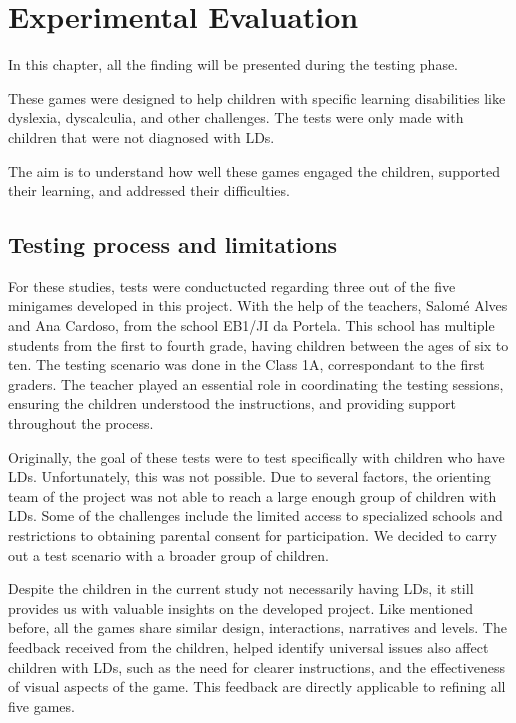 \chapter{Experimental Evaluation}
\label{cha:results}

In this chapter, all the finding will be presented during the testing phase.

These games were designed to help children with specific learning disabilities like dyslexia, dyscalculia, and other challenges. The tests were only made with children that were not diagnosed with LDs.

The aim is to understand how well these games engaged the children, supported their learning, and addressed their difficulties.


\newpage

\section{Testing process and limitations}

For these studies, tests were conductucted regarding three out of the five minigames developed in this project.
With the help of the teachers, Salomé Alves and Ana Cardoso, from the school EB1/JI da Portela. This school has multiple students from the first to fourth grade, having children between the ages of six to ten.
The testing scenario was done in the Class 1A, correspondant to the first graders.
The teacher played an essential role in coordinating the testing sessions, ensuring the children understood the instructions, and providing support throughout the process.

Originally, the goal of these tests were to test specifically with children who have LDs. Unfortunately, this was not possible. Due to several factors, the orienting team of the project was not able to reach a large enough group of children with LDs. Some of the challenges include the limited access to specialized schools and restrictions to obtaining parental consent for participation. We decided to carry out a test scenario with a broader group of children.

Despite the children in the current study not necessarily having LDs, it still provides us with valuable insights on the developed project. Like mentioned before, all the games share similar design, interactions, narratives and levels. The feedback received from the children, helped identify universal issues also affect children with LDs, such as the need for clearer instructions, and the effectiveness of visual aspects of the game. This feedback are directly applicable to refining all five games.

